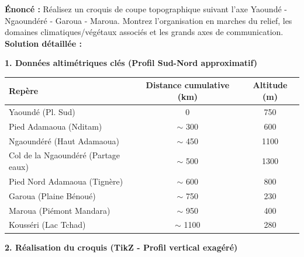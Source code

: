 \documentclass[11pt]{article}
\begin{document}
\begin{exoresolu}
\textbf{Énoncé :} Réalisez un croquis de coupe topographique suivant l'axe Yaoundé - Ngaoundéré - Garoua - Maroua. Montrez l'organisation en marches du relief, les domaines climatiques/végétaux associés et les grands axes de communication.
\tcblower
\textbf{Solution détaillée :}

\textbf{1. Données altimétriques clés (Profil Sud-Nord approximatif)}
\begin{center}
\begin{tabular}{|l|c|c|}\hline
\textbf{Repère} & \textbf{Distance cumulative (km)} & \textbf{Altitude (m)} \\ \hline
Yaoundé (Pl. Sud) & 0 & 750 \\ \hline
Pied Adamaoua (Nditam) & $\sim$ 300 & 600 \\ \hline
Ngaoundéré (Haut Adamaoua) & $\sim$ 450 & 1100 \\ \hline
Col de la Ngaoundéré (Partage eaux) & $\sim$ 500 & 1300 \\ \hline
Pied Nord Adamaoua (Tignère) & $\sim$ 600 & 800 \\ \hline
Garoua (Plaine Bénoué) & $\sim$ 750 & 230 \\ \hline
Maroua (Piémont Mandara) & $\sim$ 950 & 400 \\ \hline
Kousséri (Lac Tchad) & $\sim$ 1100 & 280 \\ \hline
\end{tabular}
\end{center}

\textbf{2. Réalisation du croquis (TikZ - Profil vertical exagéré)}

\begin{popfigure}
\begin{tikzpicture}[xscale=0.01, yscale=0.005] %
\end{tikzpicture}
\end{popfigure}


\end{exoresolu}
\end{document}

